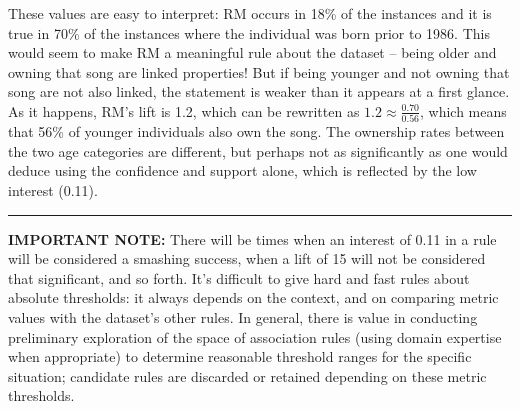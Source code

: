 These values are easy to interpret: RM occurs in 18\% of the instances and it is true in 70\% of the instances where the individual was born prior to 1986. This would seem to make RM a meaningful rule about the dataset -- being older and owning that song are linked properties! But if being younger and not owning that song are not also linked, the statement is weaker than it appears at a first glance. As it happens, RM's lift is 1.2, which can be rewritten as $1.2\approx \frac{0.70}{0.56}$, which means that 56\% of younger individuals also own the song. The ownership rates between the two age categories are different, but perhaps not as significantly as one would deduce using the confidence and support alone, which is reflected by the low interest (0.11). \begin{center}
    \rule{0.5\textwidth}{.4pt}
\end{center} \textbf{IMPORTANT NOTE:} There will be times when an interest of 0.11 in a rule will be considered a smashing success, when a lift of 15 will not be considered that significant, and so forth. It's difficult to give hard and fast rules about absolute thresholds: it always depends on the context, and on comparing metric values with the dataset's other rules. In general, there is value in conducting preliminary exploration of the space of association rules (using domain expertise when appropriate) to determine reasonable threshold ranges for the specific situation; candidate rules are discarded or retained depending on these metric thresholds. 
